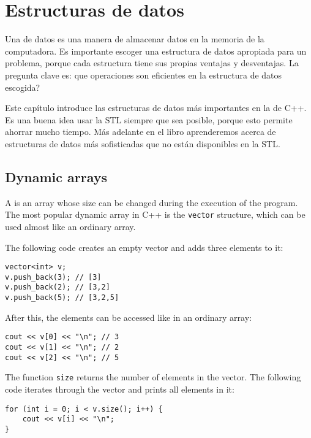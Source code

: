 \chapter{Estructuras de datos}


Una  de datos es una manera de
almacenar datos en la memoria de la computadora.
Es importante escoger una estructura de datos
apropiada para un problema, porque cada estructura
tiene sus propias ventajas y desventajas.
La pregunta clave es: que operaciones son
eficientes en la estructura de datos escogida?

Este capítulo introduce las estructuras de datos
más importantes en la 
de C++.
Es una buena idea usar la STL siempre que sea
posible, porque esto permite ahorrar mucho tiempo.
Más adelante en el libro aprenderemos acerca de
estructuras de datos más sofisticadas que no
están disponibles en la STL.

\section{Dynamic arrays}


A  is an array whose
size can be changed during the execution
of the program.
The most popular dynamic array in C++ is
the \texttt{vector} structure,
which can be used almost like an ordinary array.

The following code creates an empty vector and
adds three elements to it:

\begin{lstlisting}
vector<int> v;
v.push_back(3); // [3]
v.push_back(2); // [3,2]
v.push_back(5); // [3,2,5]
\end{lstlisting}

After this, the elements can be accessed like in an ordinary array:

\begin{lstlisting}
cout << v[0] << "\n"; // 3
cout << v[1] << "\n"; // 2
cout << v[2] << "\n"; // 5
\end{lstlisting}

The function \texttt{size} returns the number of elements in the vector.
The following code iterates through
the vector and prints all elements in it:

\begin{lstlisting}
for (int i = 0; i < v.size(); i++) {
    cout << v[i] << "\n";
}
\end{lstlisting}


